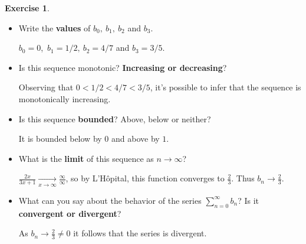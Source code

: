 \documentclass[12pt]{article}
\theoremstyle{plain}
\theoremstyle{definition}
\newtheorem{Ej}[Th]{Exercise}         %
\theoremstyle{remark}
\renewcommand{\:}{\colon}           %
\renewcommand{\.}{\Cdot}                %
\begin{document}
\begin{Ej}
\begin{enumerate}[i)]
\begin{itemize}
    \item Write the \textbf{values} of $b_0,\ b_1,\ b_2$ and $b_3$.
    \begin{ptcb}
       $b_0=0$,\ $b_1=1/2,\ b_2=4/7 $ and $b_3=3/5$.
      \end{ptcb}
    \item Is this sequence monotonic? \textbf{Increasing or decreasing}?
    \begin{ptcb}
     Observing that $0<1/2<4/7<3/5$, it's possible to infer that the sequence is monotonically increasing.
      \end{ptcb}
    \item Is this sequence \textbf{bounded}? Above, below or neither?
    \begin{ptcb}
      It is bounded below by $0$ and above by $1$.
       \end{ptcb}
    \item What is the \textbf{limit} of this sequence as $n\to\infty$?
    \begin{ptcb}
      $\frac{2x}{3x+1}\xrightarrow[x\to\infty]{}\frac{\infty}{\infty}$, so by L'Hôpital, this function converges to $\frac{2}{3}$. Thus $b_n\to\frac{2}{3}$.
       \end{ptcb}
    \vspace*{-1em}
    \item What can you say about the behavior of the series $\displaystyle\sum_{n=0}^\infty b_n$? Is it \textbf{convergent or divergent}?
    \begin{ptcb}
      As $b_n\to\frac{2}{3}\neq 0$ it follows that the series is divergent.
       \end{ptcb}
  \end{itemize}
\end{enumerate}
\end{Ej}

\end{document}
